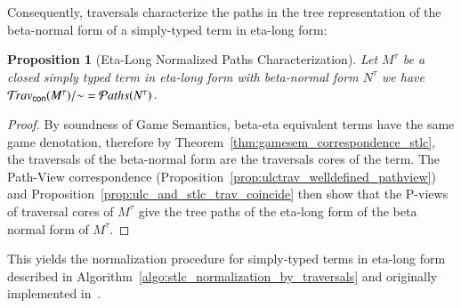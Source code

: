 \documentclass{elsarticle}
\theoremstyle{plain}
\newtheorem{proposition}[theorem]{Proposition}
\theoremstyle{definition}
\newcommand{\concrete}{{\sf con}}
\newcommand{\travsetcon}{{\travset_\concrete}}
\newcommand\pathset{{\mathcal{P}aths}} %
\begin{document}

Consequently, traversals characterize
the paths in the tree representation of the beta-normal form of a simply-typed term in eta-long form:
\begin{proposition}[Eta-Long Normalized Paths Characterization]
\label{prop:path_charact_stlc}
Let $M^\tau$ be a closed simply typed term
in eta-long form with beta-normal form $N^\tau$
we have $\travsetcon(M^\tau)/{\sim} = \pathset(N^\tau)$.
\end{proposition}
\begin{proof}
 By soundness of Game Semantics, beta-eta equivalent terms have the same game denotation, therefore by Theorem~\ref{thm:gamesem_correspondence_stlc}, the traversals of the beta-normal form are the traversals cores of the term. The Path-View correspondence (Proposition~\ref{prop:ulctrav_welldefined_pathview}) and Proposition~\ref{prop:ulc_and_stlc_trav_coincide} then show that the P-views of traversal cores of $M^\tau$ give the tree paths of the eta-long form of the beta normal form of $M^\tau$.
\end{proof}

This yields the normalization procedure for simply-typed terms in eta-long form described in Algorithm~\ref{algo:stlc_normalization_by_traversals} and originally implemented in~\cite{BlumGalop2008, Blum-HogTool}.
\end{document}
